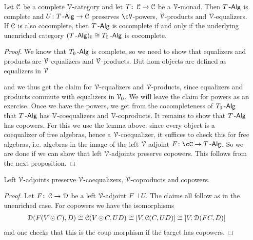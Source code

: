 \documentclass[a4paper,11pt,oneside,openany]{scrbook}
\begin{document}
\begin{thm}
	Let $\C$ be a complete $\V$-category and let $T \from \C \to \C$ be a
    $\V$-monad. Then $T\Alg$ is complete and $U \from T\Alg \to \C$ preserves
    $\cV$-powers, $\V$-products and $\V$-equalizers. If $\C$ is also cocomplete,
    then $T\Alg$ is cocomplete if and only if the underlying unenriched category
    $(T\Alg)_{0}\iso T_{0}\Alg$ is cocomplete.
\end{thm}

\begin{proof}
	We know that $T_{0}\Alg$ is complete, so we need to show that equalizers and products are $\V$-equalizers and $\V$-products. But hom-objects are
	defined as equalizers in $\V$
	\begin{center}
	\end{center}
	and we thus get the claim for $\V$-equalizers and $\V$-products, since
    equalizers and products commute with equalizers in $\V_{0}$. We will leave
    the claim for powers as an exercise. Once we have the powers, we get from
    the cocompleteness of $T_{0}\Alg$ that $T\Alg$ has $\V$-coequalizers and
    $\V$-coproducts. It remains to show that $T\Alg$ has copowers. For this we
    use the lemma above: since every object is a coequalizer of free
	algebras, hence a $\V$-coequalizer, it suffices to check this for free
    algebras, i.e. algebras in the image of the left $\V$-adjoint $F\from\cC\to
    T\Alg$. So we are done if we can show that left $\V$-adjoints preserve
    copowers. This follows from the next proposition.
\end{proof}

\begin{prop}
	Left $\V$-adjoints preserve $\V$-coequalizers, $\V$-coproducts and copowers.
\end{prop}

\begin{proof}
	Let $F \from \C \to \D$ be a left $\V$-adjoint $F\dashv U$. The claims all follow as in the unenriched case. For copowers we have the isomorphisms
	\begin{align*}
		\D(F(V\copw C),D) \iso \C(V\copw C,UD) \iso \lbrack V,\C(C,UD) \rbrack \iso \lbrack V,\D(FC,D) \rbrack
	\end{align*}
	and one checks that this is the coup morphism if the target has copowers.
\end{proof}
\end{document}

